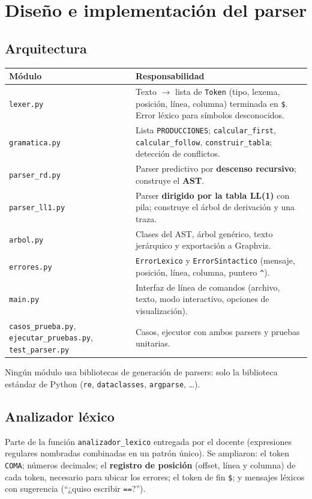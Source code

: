 \section{Diseño e implementación del parser}

\subsection{Arquitectura}
\begin{center}\small
\begin{tabular}{@{}>{\raggedright\arraybackslash}p{4.4cm} >{\raggedright\arraybackslash}p{10.2cm}@{}}
\toprule
\textbf{Módulo} & \textbf{Responsabilidad} \\
\midrule
\texttt{lexer.py} & Texto $\to$ lista de \texttt{Token} (tipo, lexema, posición, línea, columna) terminada en \texttt{\$}. Error léxico para símbolos desconocidos. \\
\texttt{gramatica.py} & Lista \texttt{PRODUCCIONES}; \texttt{calcular\_first}, \texttt{calcular\_follow}, \texttt{construir\_tabla}; detección de conflictos. \\
\texttt{parser\_rd.py} & Parser predictivo por \textbf{descenso recursivo}; construye el \textbf{AST}. \\
\texttt{parser\_ll1.py} & Parser \textbf{dirigido por la tabla LL(1)} con pila; construye el árbol de derivación y una traza. \\
\texttt{arbol.py} & Clases del AST, árbol genérico, texto jerárquico y exportación a Graphviz. \\
\texttt{errores.py} & \texttt{ErrorLexico} y \texttt{ErrorSintactico} (mensaje, posición, línea, columna, puntero \texttt{\^{}}). \\
\texttt{main.py} & Interfaz de línea de comandos (archivo, texto, modo interactivo, opciones de visualización). \\
\texttt{casos\_prueba.py}, \texttt{ejecutar\_pruebas.py}, \texttt{test\_parser.py} & Casos, ejecutor con ambos parsers y pruebas unitarias. \\
\bottomrule
\end{tabular}
\end{center}
Ningún módulo usa bibliotecas de generación de parsers: solo la biblioteca estándar de Python
(\texttt{re}, \texttt{dataclasses}, \texttt{argparse}, \dots).

\subsection{Analizador léxico}
Parte de la función \texttt{analizador\_lexico} entregada por el docente (expresiones regulares nombradas combinadas en un patrón único).
Se ampliaron: el token \texttt{COMA}; números decimales; el \textbf{registro de posición} (offset, línea y columna) de cada token,
necesario para ubicar los errores; el token de fin \texttt{\$}; y mensajes léxicos con sugerencia (``¿quiso escribir \texttt{==}?'').

